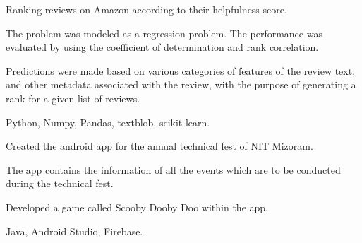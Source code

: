 \begin{tightemize}
\item Ranking reviews on Amazon according to their helpfulness score.
\item The problem was modeled as a regression problem. The performance was evaluated by using the coefficient of determination and rank correlation.
\item Predictions were made based on various categories of features of the review text, and other metadata associated with the review, with the purpose of generating a rank for a given list of reviews.
\item {} Python, Numpy, Pandas, textblob, scikit-learn.
\end{tightemize}
\sectionsep

\begin{tightemize}\item Created the android app for the annual technical fest of NIT Mizoram.
\item The app contains the information of all the events which are to be conducted during the technical fest.
\item Developed a game called Scooby Dooby Doo within the app.
\item {} Java, Android Studio, Firebase.
\end{tightemize}
\sectionsep